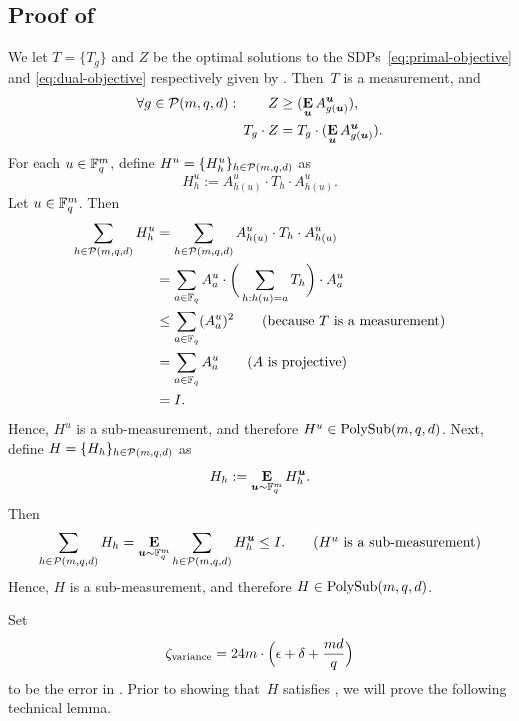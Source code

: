 \subsection{Proof of }
We let $T = \{T_g\}$ and $Z$ be the optimal solutions to the SDPs~\eqref{eq:primal-objective} and \eqref{eq:dual-objective} respectively
given by .
Then~$T$ is a measurement, and
\begin{align}
 \forall g \in \mathcal{P}(m, q, d): \qquad
 Z &\geq (\mathop{\bf E\/}_{\boldsymbol{u}} A^{\boldsymbol{u}}_{g(\boldsymbol{u})}),  \label{eq:Z-greater-than-A}\\
T_g \cdot Z &= T_g \cdot (\mathop{\bf E\/}_{\boldsymbol{u}} A^{\boldsymbol{u}}_{g(\boldsymbol{u})}).\label{eq:swap-Z-for-A}
\end{align}
For each $u \in \mathbb F_q^m$, define $H^u = \{H^u_h\}_{h \in \mathcal{P}(m, q, d)}$ as
\begin{equation*}
    H^u_h := A^u_{h(u)}\cdot T_h \cdot A^u_{h(u)}.
\end{equation*}
Let $u \in \mathbb F_q^m$. Then
\begin{align*}
    \sum_{h \in \mathcal{P}(m, q, d)} H^u_h
    & = \sum_{h \in \mathcal{P}(m, q, d)} A^u_{h(u)} \cdot T_h \cdot A^u_{h(u)}\\
    & = \sum_{a \in \mathbb F_q}A^u_{a} \cdot \bigg(\sum_{h:h(u) = a}  T_h\bigg) \cdot A^u_{a}\\
    & \leq \sum_{a \in \mathbb F_q} (A^u_{a})^2\tag{because~$T$ is a measurement}\\
    & = \sum_{a \in \mathbb F_q} A^u_{a}\tag{$A$ is projective}\\
    & = I.
\end{align*}
Hence, $H^u$ is a sub-measurement,
and therefore $H^u \in \mathrm{PolySub}(m, q, d)$.
Next, define $H = \{H_h\}_{h \in \mathcal{P}(m, q, d)}$ as
\begin{equation*}
H_h := \mathop{\bf E\/}_{\boldsymbol{u} \sim \mathbb F_q^m}H^{\boldsymbol{u}}_h.
\end{equation*}
Then
\begin{equation*}
\sum_{h \in \mathcal{P}(m, q, d)} H_h
= \mathop{\bf E\/}_{\boldsymbol{u} \sim \mathbb F_q^m} \sum_{h \in \mathcal{P}(m, q, d)} H^{\boldsymbol{u}}_h
\leq I. \tag{$H^u$ is a sub-measurement}
\end{equation*}
Hence, $H$ is a sub-measurement,
and therefore $H \in \mathrm{PolySub}(m, q, d)$.

Set
\begin{equation*}
\zeta_{\mathrm{variance}} = 24m\cdot\Big(\epsilon + \delta + \frac{md}{q}\Big)
\end{equation*}
to be the error in .
Prior to showing that~$H$ satisfies , we will prove the following technical lemma.

